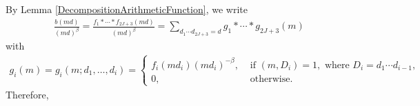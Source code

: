 \documentclass[oneside, 12pt]{amsart}
\theoremstyle{definition}
\renewcommand{\pmod}[1]{\,(\textup{mod}\,#1)}
\begin{document}
By Lemma \ref{DecompositionArithmeticFunction}, we write 
\begin{align*}
\frac{b(md)}{(md)^\beta}=\frac{f_1* \cdots * f_{2J+3}(md)}{(md)^\beta}= \sum_{d_1\cdots d_{2J+3}=d}g_1 * \cdots * g_{2J+3}(m)
\end{align*}
with 
\begin{align*}
g_i(m)=g_i(m;d_1, \dots, d_i)
=
\left\{\begin{array}{ll}
f_i(md_i)(md_i)^{-\beta}, & \text{ if } (m, D_i)=1, \text{ where } D_i=d_1 \cdots d_{i-1},\\
0, & \text{ otherwise. }
\end{array}\right.
\end{align*}
Therefore, 
\end{document}
